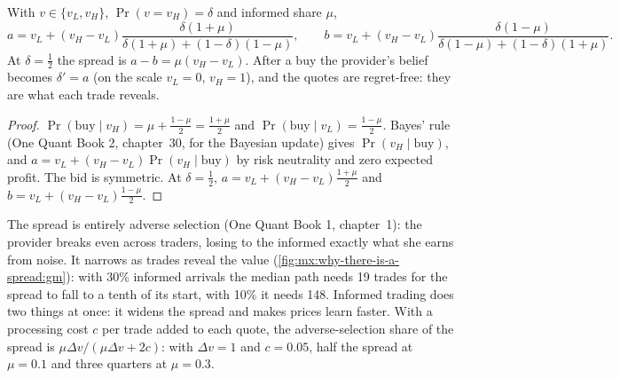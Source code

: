 \begin{proposition}\label{prop:mx:why-there-is-a-spread:gmquotes}
With $v\in\{v_L,v_H\}$, $\Pr(v=v_H)=\delta$ and informed share $\mu$,
\[
a = v_L+(v_H-v_L)\frac{\delta(1+\mu)}{\delta(1+\mu)+(1-\delta)(1-\mu)},\qquad
b = v_L+(v_H-v_L)\frac{\delta(1-\mu)}{\delta(1-\mu)+(1-\delta)(1+\mu)}.
\]
At $\delta=\tfrac12$ the spread is $a-b=\mu(v_H-v_L)$. After a buy the provider's belief becomes $\delta'=a$ (on the scale $v_L=0$, $v_H=1$), and the
quotes are regret-free: they are what each trade reveals.
\end{proposition}

\begin{proof}
$\Pr(\text{buy}\mid v_H)=\mu+\tfrac{1-\mu}{2}=\tfrac{1+\mu}{2}$ and $\Pr(\text{buy}\mid v_L)=\tfrac{1-\mu}{2}$. Bayes' rule (One Quant Book 2, chapter~30,
for the Bayesian update) gives $\Pr(v_H\mid\text{buy})$, and $a=v_L+(v_H-v_L)\Pr(v_H\mid\text{buy})$ by risk neutrality and zero expected profit. The bid is
symmetric. At $\delta=\tfrac12$, $a=v_L+(v_H-v_L)\tfrac{1+\mu}{2}$ and $b=v_L+(v_H-v_L)\tfrac{1-\mu}{2}$.
\end{proof}

\label{lst:mx:why-there-is-a-spread:gm}

The spread is entirely adverse selection (One Quant Book 1, chapter~1): the provider breaks even across traders, losing to the informed exactly what she
earns from noise. It narrows as trades reveal the value (\cref{fig:mx:why-there-is-a-spread:gm}): with 30\% informed arrivals the median path needs 19
trades for the spread to fall to a tenth of its start, with 10\% it needs 148. Informed trading does two things at once: it widens the spread and makes
prices learn faster. With a processing cost $c$ per trade added to each quote, the adverse-selection share of the spread is $\mu\Delta v/(\mu\Delta
v+2c)$: with $\Delta v=1$ and $c=0.05$, half the spread at $\mu=0.1$ and three quarters at $\mu=0.3$.

